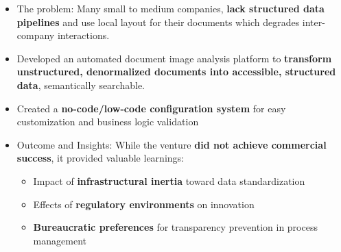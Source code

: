 \documentclass[letterpaper,11pt]{article}
\newcommand{\resumeItem}[1]{
  \item\small{
    {#1 \vspace{0pt}}
  }
}
\newcommand{\resumeItemListStart}{\begin{itemize}}
\newcommand{\resumeItemListEnd}{\end{itemize}\vspace{-5pt}}
\begin{document}

      \resumeItemListStart
        \resumeItem{The problem: Many small to medium companies, \textbf{lack structured data pipelines} and use local layout for their documents which degrades inter-company interactions.}
        \resumeItem{Developed an automated document image analysis platform to \textbf{transform unstructured, denormalized documents into accessible, structured data}, semantically searchable.}
        \resumeItem{Created a \textbf{no-code/low-code configuration system} for easy customization and business logic validation}
        \resumeItem{Outcome and Insights: While the venture \textbf{did not achieve commercial success}, it provided valuable learnings: 
          \begin{itemize}
            \item Impact of \textbf{infrastructural inertia} toward data standardization
            \item Effects of \textbf{regulatory environments} on innovation
            \item \textbf{Bureaucratic preferences} for transparency prevention in process management
          \end{itemize}
        }
      \resumeItemListEnd
    
\end{document}
